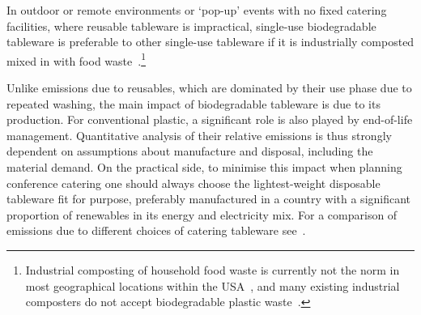 \documentclass[../SustainableHEP.tex]{subfiles}
\begin{document}
In outdoor or remote environments or ‘pop-up’ events with no fixed catering facilities, where reusable tableware is impractical, single-use biodegradable tableware is preferable to other single-use tableware if it is industrially composted mixed in with food waste~\cite{UNEP2021}.\footnote{Industrial composting of household food waste is currently not the norm in most geographical locations within the USA~\cite{EPAWasteFoodMgmt}, and many existing industrial composters do not accept biodegradable plastic waste~\cite{BioplasticsAtIndustrialSites}.} 

Unlike emissions due to reusables, which are dominated by their use phase due to repeated washing, the  main impact of biodegradable tableware is due to its production. For conventional plastic, a significant role is also played by end-of-life management.  Quantitative analysis of their relative emissions is thus strongly dependent on assumptions about manufacture and disposal, including the material demand.  On the practical side, to minimise this impact when planning conference catering one should always choose the lightest-weight disposable tableware fit for purpose, preferably manufactured in a country with a significant proportion of renewables in its energy and electricity mix.  For a comparison of emissions due to different choices of catering tableware see~.
\end{document}
